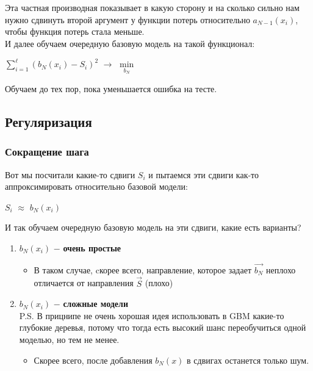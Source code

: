         Эта частная производная показывает в какую сторону и на сколько сильно нам нужно сдвинуть второй аргумент у функции потерь относительно $a_{N - 1}(x_i)$, чтобы функция потерь стала меньше.\\

        И далее обучаем очередную базовую модель на такой функционал:
        \begin{center}
        \Large
            $\sum\limits_{i = 1}^{\ell}(b_N(x_i) - S_i)^2$ $\longrightarrow$ $\min\limits_{b_N}$
        \end{center}

        Обучаем до тех пор, пока уменьшается ошибка на тесте.


    \subsection{Регуляризация}

        \subsubsection{Сокращение шага}

            Вот мы посчитали какие-то сдвиги $S_i$ и пытаемся эти сдвиги как-то аппроксимировать относительно базовой модели:
            \begin{center}
                $S_i$ $\approx$ $b_N(x_i)$
            \end{center}
            И так обучаем очередную базовую модель на эти сдвиги, какие есть варианты?
            \begin{enumerate}
                \item $b_N(x_i)$ $-$ \textbf{очень простые}
                    \begin{itemize}
                        \item В таком случае, cкорее всего, направление, которое задает $\Vec{b_N}$ неплохо отличается от направления $\Vec{S}$ (плохо)
                    \end{itemize}
                
                
                \item $b_N(x_i)$ $-$ \textbf{сложные модели}\\
                
                    P.S. В прицнипе не очень хорошая идея использовать в GBM какие-то глубокие деревья, потому что тогда есть высокий шанс переобучиться одной моделью, но тем не менее.
            
                    \begin{itemize}
                        \item Скорее всего, после добавления $b_N(x)$ в сдвигах останется только шум.
                    \end{itemize}
            \end{enumerate}

